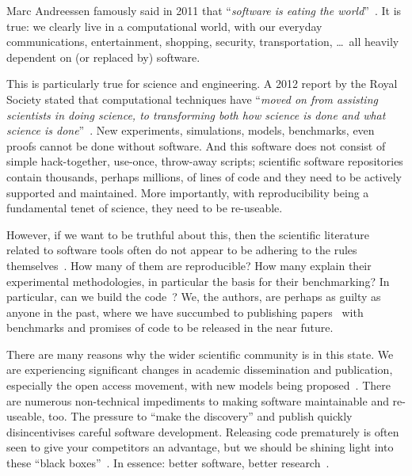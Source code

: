 \documentclass[10pt,conference,final]{IEEEtran}
\begin{document}
Marc Andreessen famously said in 2011 that ``{\emph{software is eating the
world}}''~\cite{andreessen:2011}. It is true: we clearly live in a
computational world, with our everyday communications, entertainment,
shopping, security, transportation, \dots\ all heavily dependent on
(or replaced by) software.

This is particularly true for science and engineering. A 2012 report
by the Royal Society stated that computational techniques have
``{\emph{moved on from assisting scientists in doing science, to
transforming both how science is done and what science is
done}}''~\cite{rssaaoe:2012}. New experiments, simulations, models,
benchmarks, even proofs cannot be done without software. And this
software does not consist of simple hack-together, use-once,
throw-away scripts; scientific software repositories contain
thousands, perhaps millions, of lines of code and they need to be
actively supported and maintained. More importantly, with
reproducibility being a fundamental tenet of science, they need to be
re-useable.

However, if we want to be truthful about this, then the scientific
literature related to software tools often do not appear to be
adhering to the rules themselves~\cite{nature:2011}. How many of them
are reproducible? How many explain their experimental methodologies,
in particular the basis for their benchmarking? In particular, can we
build the code~\cite{collberg-et-al:2014}? We, the authors, are
perhaps as guilty as anyone in the past, where we have succumbed to
publishing papers~\cite{crick-et-al:2009,Berdine2011SLAyer} with
benchmarks and promises of code to be released in the near future.

There are many reasons why the wider scientific community is in this
state. We are experiencing significant changes in academic
dissemination and publication, especially the open access movement,
with new models being
proposed~\cite{stodden-et-al:2013,fursin+dubach:2014}.  There are
numerous non-technical impediments to making software maintainable and
re-useable, too. The pressure to ``make the discovery'' and publish
quickly disincentivises careful software development. Releasing code
prematurely is often seen to give your competitors an advantage, but
we should be shining light into these ``black
boxes''~\cite{morin-et-al:2012}. In essence: better software, better
research~\cite{goble:2014}.
\end{document}
